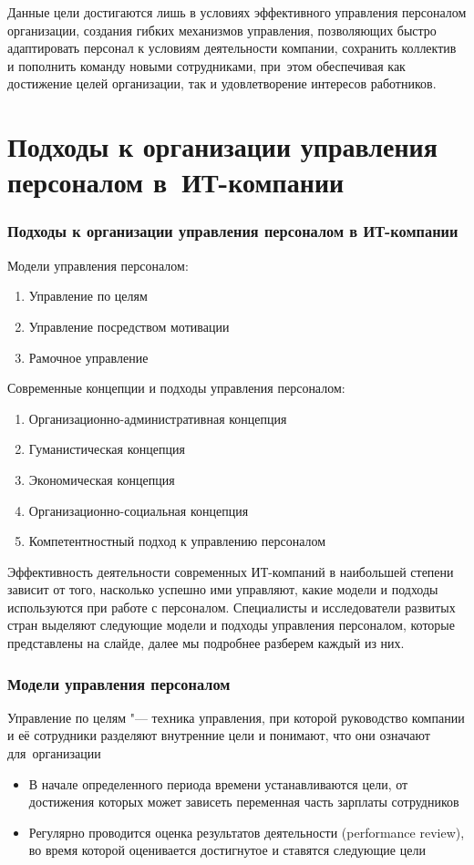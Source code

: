 \documentclass{../industrial-development}
\begin{document}
Данные цели достигаются лишь в условиях эффективного управления персоналом организации, создания гибких механизмов управления, позволяющих быстро адаптировать персонал к условиям деятельности компании, сохранить  коллектив и пополнить команду новыми сотрудниками, при~этом обеспечивая как достижение целей организации, так и удовлетворение интересов работников.

\section{Подходы к организации управления персоналом в~ИТ-компании}

\begin{frame} \frametitle{Подходы к организации управления персоналом в ИТ-компании}
 Модели управления персоналом:
    \begin{enumerate}
    \item Управление по целям
    \item Управление посредством мотивации
    \item Рамочное управление
    \end{enumerate}
 Современные концепции и подходы управления персоналом:
    \begin{enumerate}
\item Организационно-административная концепция 
\item Гуманистическая концепция
\item Экономическая концепция
\item Организационно-социальная концепция
\item Компетентностный подход к управлению персоналом
    \end{enumerate}
\end{frame}
\lecturenotes

Эффективность деятельности современных ИТ-компаний в наибольшей степени зависит от того, насколько успешно ими управляют, какие модели и подходы используются при работе с персоналом. Специалисты и исследователи развитых стран выделяют следующие модели и подходы управления персоналом, которые представлены на слайде, далее мы подробнее разберем каждый из них.
	
\begin{frame} \frametitle{Модели управления персоналом}
 \alert{Управление по целям} "--- техника управления, при которой руководство компании и её сотрудники разделяют внутренние цели и понимают, что они означают для~организации
  \begin{itemize}
	\item В начале определенного периода времени устанавливаются цели, от достижения которых может зависеть переменная часть зарплаты сотрудников
\item Регулярно проводится оценка результатов деятельности (performance review), во время которой оценивается достигнутое и ставятся следующие цели
  \end{itemize}
\end{frame}
\lecturenotes
\end{document}
